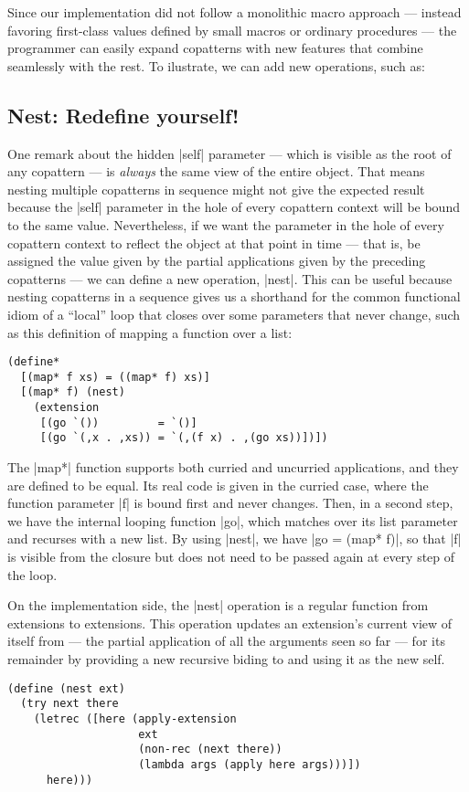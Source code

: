 Since our implementation did not follow a monolithic macro approach --- instead favoring first-class values defined by small macros or ordinary procedures --- the programmer can easily expand copatterns with new features that combine seamlessly with the rest.
To ilustrate, we can add new operations, such as:

\subsection{Nest: Redefine yourself!}
One remark about the hidden \scm|self| parameter --- which is visible as the root of any copattern --- is \emph{always} the same view of the entire object.
That means nesting multiple copatterns in sequence might not give the expected result because the \scm|self| parameter in the hole of every copattern context will be bound to the same value.
Nevertheless, if we want the parameter in the hole of every copattern context to reflect the object at that point in time --- that is, be assigned the value given by the partial applications given by the preceding copatterns --- we can define a new operation, \scm|nest|.
This can be useful because nesting copatterns in a sequence gives us a shorthand for the common functional idiom of a ``local'' loop that closes over some parameters that never change, such as this definition of mapping a function over a list:
\begin{verbatim}
(define*
  [(map* f xs) = ((map* f) xs)]
  [(map* f) (nest)
    (extension
     [(go `())         = `()]
     [(go `(,x . ,xs)) = `(,(f x) . ,(go xs))])])
\end{verbatim}
The \scm|map*| function supports both curried and uncurried applications, and they are defined to be equal.
Its real code is given in the curried case, where the function parameter \scm|f| is bound first and never changes.
Then, in a second step, we have the internal looping function \scm|go|, which matches over its list parameter and recurses with a new list.
By using \scm|nest|, we have \scm|go = (map* f)|, so that \scm|f| is visible from the closure but does not need to be passed again at every step of the loop.

On the implementation side, the \scm|nest| operation is a regular function from extensions to extensions.
This operation updates an extension's current view of itself from  --- the partial application of all the arguments seen so far --- for its remainder by providing a new recursive biding to  and using it as the new self.
\begin{verbatim}
(define (nest ext)
  (try next there
    (letrec ([here (apply-extension
                    ext
                    (non-rec (next there))
                    (lambda args (apply here args)))])
      here)))
\end{verbatim}


